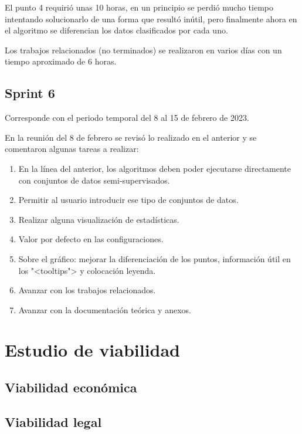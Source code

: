 El punto 4 requirió unas 10 horas, en un principio se perdió mucho tiempo
intentando solucionarlo de una forma que resultó inútil, pero finalmente ahora en
el algoritmo se diferencian los datos clasificados por cada uno.

Los trabajos relacionados (no terminados) se realizaron en varios días con un
tiempo aproximado de 6 horas.

\subsection{Sprint 6}
Corresponde con el periodo temporal del 8 al 15 de febrero de 2023.

En la reunión del 8 de febrero se revisó lo realizado en el anterior y se
comentaron algunas tareas a realizar:
\begin{enumerate}
    \item En la línea del anterior, los algoritmos deben poder ejecutarse
    directamente con conjuntos de datos semi-supervisados.
    \item Permitir al usuario introducir ese tipo de conjuntos de datos.
    \item Realizar alguna visualización de estadísticas.
    \item Valor por defecto en las configuraciones.
    \item Sobre el gráfico: mejorar la diferenciación de los puntos, información
    útil en los "<tooltips"> y colocación leyenda.
    \item Avanzar con los trabajos relacionados.
    \item Avanzar con la documentación teórica y anexos.
\end{enumerate}


\section{Estudio de viabilidad}

\subsection{Viabilidad económica}

\subsection{Viabilidad legal}


